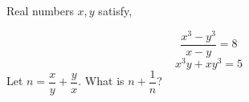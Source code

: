Real numbers $x,y$ satisfy,

\[
\dfrac{x^3-y^3}{x-y} = 8
\]\[
x^3y+xy^3 = 5
\]Let $n = \dfrac{x}{y} + \dfrac{y}{x}$. What is $n + \dfrac{1}{n}$?
